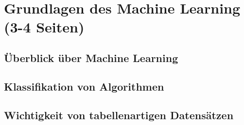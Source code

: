 \section{Grundlagen des Machine Learning (3-4 Seiten)}
\subsection{Überblick über Machine Learning}
\subsection{Klassifikation von Algorithmen}
\subsection{Wichtigkeit von tabellenartigen Datensätzen}